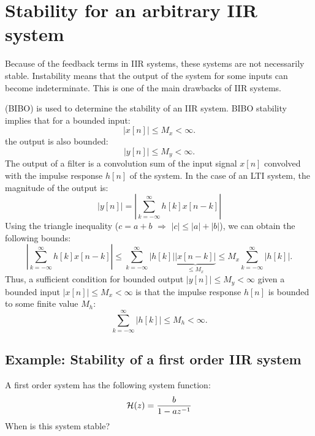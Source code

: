 \section{Stability for an arbitrary IIR system}

Because of the feedback terms in IIR systems, these systems are not
necessarily stable. Instability means that the output of the system
for some inputs can become indeterminate. This is one of the main
drawbacks of IIR systems.

 (BIBO)  is used to determine the
stability of an IIR system. BIBO stability implies that for a bounded
input:
\begin{equation}
|x[n]| \le M_x < \infty.
\end{equation}
the output is also bounded:
\begin{equation}
|y[n]| \le M_y < \infty.
\end{equation}
The output of a filter is a convolution sum of the input signal $x[n]$
convolved with the impulse response $h[n]$ of the system. In the case
of an LTI system, the magnitude of the output is:
\begin{equation}
|y[n]| = \left| \sum_{k=-\infty}^{\infty} h[k] x[n-k]\right|
\end{equation}
Using the triangle inequality ($c = a+b$ $\Rightarrow$ $|c|\le |a|+|b|$), we can obtain the following bounds:
\begin{equation}
\left|\sum_{k=-\infty}^{\infty} h[k]x[n-k]\right| \le \sum_{k=-\infty}^{\infty}|h[k]|\underbrace{|x[n-k]|}_{\le M_x} \le M_x \sum_{k=-\infty}^{\infty}|h[k]|.
\end{equation}
Thus, a sufficient condition for bounded output $|y[n]| \le M_y < \infty$ given a bounded input $|x[n]|\le M_x < \infty$ is that the impulse response $h[n]$ is bounded to some finite value $M_h$:
\begin{equation}
\boxed{
\sum_{k=-\infty}^{\infty} |h[k]| \le M_h < \infty.
}
\end{equation}

\subsection{Example: Stability of a first order IIR system}

A first order system has the following system function:
\begin{equation}
\mathcal{H}(z) = \frac{b}{1-a z^{-1}}
\end{equation}
When is this system stable?

